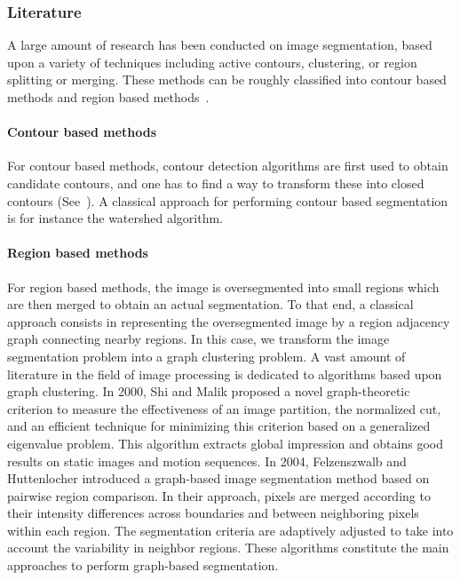 \documentclass{article}
\begin{document}
        \subsubsection{Literature}
            A large amount of research has been conducted on image segmentation, based upon a variety of techniques including active contours, clustering, or region splitting or merging. These methods can be roughly classified into contour based methods and region based methods~\cite{arbelaez2011}.

            \paragraph{Contour based methods} For contour based methods, contour detection algorithms are first used to obtain candidate contours, and one has to find a way to transform these into closed contours (See~\cite{ren2005, arbelaez2011}). A classical approach for performing contour based segmentation is for instance the watershed algorithm.

            \paragraph{Region based methods} For region based methods, the image is oversegmented into small regions which are then merged to obtain an actual segmentation. To that end, a classical approach consists in representing the oversegmented image by a region adjacency graph connecting nearby regions. In this case, we transform the image segmentation problem into a graph clustering problem. A vast amount of literature in the field of image processing is dedicated to algorithms based upon graph clustering. In 2000, Shi and Malik \cite{shi2000} proposed a novel graph-theoretic criterion to measure the effectiveness of an image partition, the normalized cut, and an efficient technique for minimizing this criterion based on a generalized eigenvalue problem. This algorithm extracts global impression and obtains good results on static images and motion sequences. In 2004, Felzenszwalb and Huttenlocher \cite{felzenszwalb2004} introduced a graph-based image segmentation method based on pairwise region comparison. In their approach, pixels are merged according to their intensity differences across boundaries and between neighboring pixels within each region. The segmentation criteria are adaptively adjusted to take into account the variability in neighbor regions. These algorithms constitute the main approaches to perform graph-based segmentation.
\end{document}
